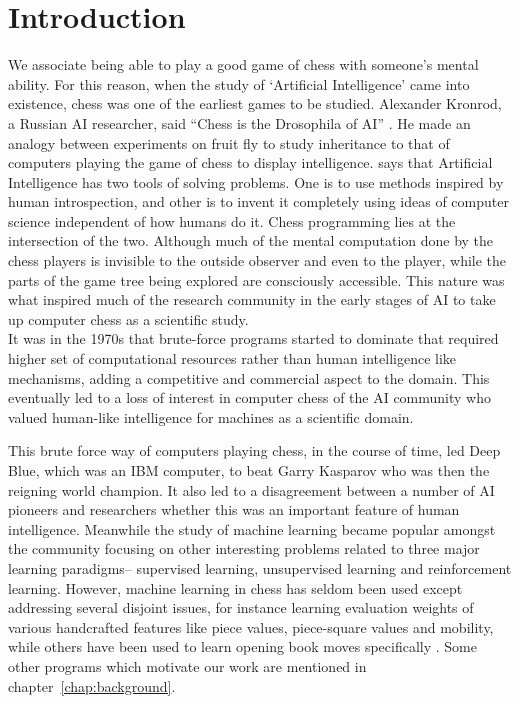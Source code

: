 \chapter{Introduction}
\label{chap:introduction}
We associate being able to play a good game of chess with someone's mental 
ability. For this reason, when the study of `Artificial Intelligence' came into 
existence, chess was one of the earliest games to be studied. Alexander Kronrod, 
a Russian AI researcher, said ``Chess is the Drosophila of AI'' 
\cite{mccarthy1990chess}. He made an analogy between experiments on fruit fly to 
study inheritance to that of computers playing the game of chess to display 
intelligence. \citet{mccarthy} says that Artificial Intelligence has two tools 
of solving problems. One is to use methods inspired by human introspection, and 
other is to invent it completely using ideas of computer science independent of 
how humans do it. Chess programming lies at the intersection of the two. 
Although much of the mental computation done by the chess players is invisible 
to the outside observer and even to the player, while the parts of the game 
tree being explored are consciously accessible. This nature was what inspired 
much of the research community in the early stages of AI to take up computer 
chess as a scientific study.\\

It was in the 1970s that brute-force programs started to dominate 
that required higher set of computational resources rather than human 
intelligence like mechanisms, adding a competitive and commercial aspect to the 
domain. This eventually led to a loss of interest in computer chess of the AI 
community who valued human-like intelligence for machines as a scientific 
domain. 

This brute force way of computers playing chess, in the course of 
time, led Deep Blue, which was an IBM computer, to beat Garry Kasparov who was 
then the reigning world champion. It also led to a disagreement between a 
number of AI pioneers and researchers whether this was an important feature of 
human intelligence. Meanwhile the study of machine learning became popular 
amongst the community focusing on other interesting problems related to three 
major learning paradigms-- supervised learning, unsupervised learning and 
reinforcement learning. However, machine learning in chess has seldom been used 
except addressing several disjoint issues, for instance learning evaluation 
weights of various handcrafted features like piece 
values\cite{beal1997learning}, piece-square values\cite{beal1999learning} and 
mobility, while others have been used to learn opening book moves specifically 
\cite{hyatt1999book}. Some other programs which motivate our work are mentioned 
in chapter~\ref{chap:background}. 

